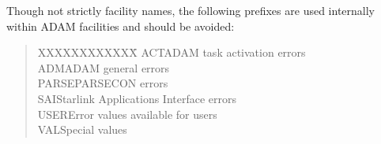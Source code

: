 \documentclass[twoside,11pt]{article}
\renewcommand{\_}{{\tt\char'137}}
\begin{document}
\goodbreak
Though not strictly facility names, the following prefixes are used internally
within ADAM facilities and should be avoided:
\begin{quote}
\begin{tabbing}
XXXXXXXXXXXX\=\kill
ACT\>ADAM task activation errors\\
ADM\>ADAM general errors\\
PARSE\>PARSECON errors\\
SAI\>Starlink Applications Interface errors\\
USER\>Error values available for users\\
VAL\>Special values
\end{tabbing}
\end{quote}
\end{document}

